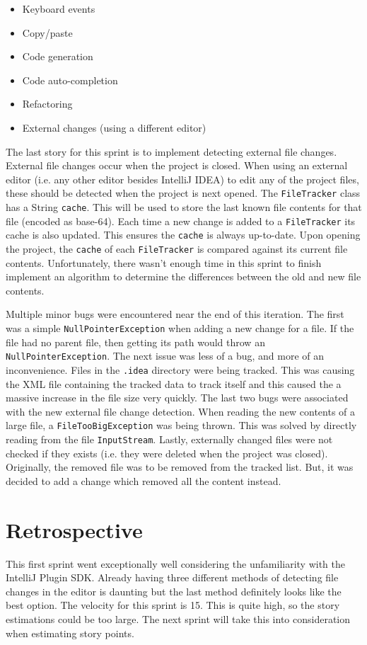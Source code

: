 \begin{itemize}
  \item Keyboard events
  \item Copy/paste
  \item Code generation
  \item Code auto-completion
  \item Refactoring
  \item External changes (using a different editor)
\end{itemize}

The last story for this sprint is to implement detecting external file changes. External file changes occur when the project is closed. When using an external editor (i.e. any other editor besides IntelliJ IDEA) to edit any of the project files, these should be detected when the project is next opened. The \texttt{FileTracker} class has a String \texttt{cache}. This will be used to store the last known file contents for that file (encoded as base-64). Each time a new change is added to a \texttt{FileTracker} its cache is also updated. This ensures the \texttt{cache} is always up-to-date. Upon opening the project, the \texttt{cache} of each \texttt{FileTracker} is compared against its current file contents. Unfortunately, there wasn't enough time in this sprint to finish implement an algorithm to determine the differences between the old and new file contents.

Multiple minor bugs were encountered near the end of this iteration. The first was a simple \texttt{NullPointerException} when adding a new change for a file. If the file had no parent file, then getting its path would throw an \texttt{NullPointerException}. The next issue was less of a bug, and more of an inconvenience. Files in the \texttt{.idea} directory were being tracked. This was causing the XML file containing the tracked data to track itself and this caused the a massive increase in the file size very quickly. The last two bugs were associated with the new external file change detection. When reading the new contents of a large file, a \texttt{FileTooBigException} was being thrown. This was solved by directly reading from the file \texttt{InputStream}. Lastly, externally changed files were not checked if they exists (i.e. they were deleted when the project was closed). Originally, the removed file was to be removed from the tracked list. But, it was decided to add a change which removed all the content instead.

\section{Retrospective}
This first sprint went exceptionally well considering the unfamiliarity with the IntelliJ Plugin SDK. Already having three different methods of detecting file changes in the editor is daunting but the last method definitely looks like the best option. The velocity for this sprint is 15. This is quite high, so the story estimations could be too large. The next sprint will take this into consideration when estimating story points.
